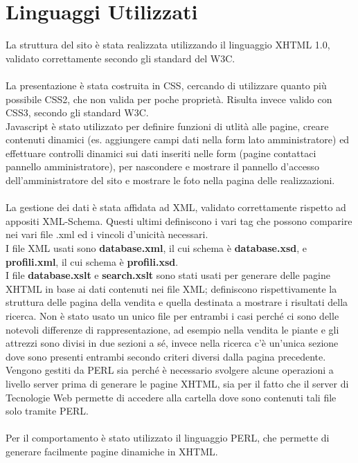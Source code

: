 \section{Linguaggi Utilizzati}{
	La struttura del sito è stata realizzata utilizzando il linguaggio XHTML 1.0, validato correttamente secondo gli standard del W3C. \\
	\\
	La presentazione è stata costruita in CSS, cercando di utilizzare quanto più possibile CSS2, che non valida per poche proprietà. Risulta invece valido con CSS3, secondo gli standard W3C.
	\\
	Javascript è stato utilizzato per definire funzioni di utlità alle pagine, creare contenuti dinamici (es. aggiungere campi dati nella form lato amministratore) ed effettuare controlli dinamici sui dati inseriti nelle form (pagine contattaci pannello amministratore), per nascondere e mostrare il pannello d'accesso dell'amministratore del sito e mostrare le foto nella pagina delle realizzazioni.\\
	\\
	La gestione dei dati è stata affidata ad XML, validato correttamente rispetto ad appositi XML-Schema. Questi ultimi definiscono i vari tag che possono comparire nei vari file .xml ed i vincoli d'unicità necessari. \\
	I file XML usati sono \textbf{database.xml}, il cui schema è \textbf{database.xsd}, e \textbf{profili.xml}, il cui schema è \textbf{profili.xsd}.\\
	I file \textbf{database.xslt} e \textbf{search.xslt} sono stati usati per generare delle pagine XHTML in base ai dati contenuti nei file XML; definiscono rispettivamente la struttura delle pagina della vendita e quella destinata a mostrare i risultati della ricerca. Non è stato usato un unico file per entrambi i casi perché ci sono delle notevoli differenze di rappresentazione, ad esempio nella vendita le piante e gli attrezzi sono divisi in due sezioni a sé, invece nella ricerca c'è un'unica sezione dove sono presenti entrambi secondo criteri diversi dalla pagina precedente.
	Vengono gestiti da PERL sia perché è necessario svolgere alcune operazioni a livello server prima di generare le pagine XHTML, sia per il fatto che il server di Tecnologie Web permette di accedere alla cartella dove sono contenuti tali file solo tramite PERL.\\
	\\
	Per il comportamento è stato utilizzato il linguaggio PERL, che permette di generare facilmente pagine dinamiche in XHTML.\\ 
}
